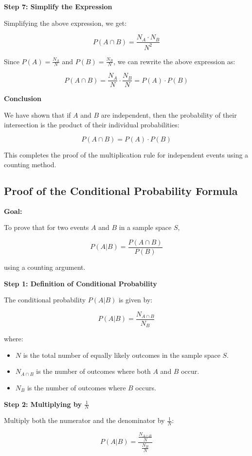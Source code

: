 \documentclass{article}
\begin{document}
\textbf{Step 7: Simplify the Expression}

Simplifying the above expression, we get:

\[
P(A \cap B) = \frac{N_A \cdot N_B}{N^2}
\]

Since \( P(A) = \frac{N_A}{N} \) and \( P(B) = \frac{N_B}{N} \), we can rewrite the above expression as:

\[
P(A \cap B) = \frac{N_A}{N} \cdot \frac{N_B}{N} = P(A) \cdot P(B)
\]

\textbf{Conclusion}

We have shown that if \( A \) and \( B \) are independent, then the probability of their intersection is the product of their individual probabilities:

\[
P(A \cap B) = P(A) \cdot P(B)
\]

This completes the proof of the multiplication rule for independent events using a counting method.

\subsection*{Proof of the Conditional Probability Formula}

\textbf{Goal:}

To prove that for two events \( A \) and \( B \) in a sample space \( S \),

\[ P(A|B) = \frac{P(A \cap B)}{P(B)} \]

using a counting argument.

\textbf{Step 1: Definition of Conditional Probability}

The conditional probability \( P(A|B) \) is given by:

\[
P(A|B) = \frac{N_{A \cap B}}{N_B}
\]

where:
\begin{itemize}
    \item \( N \) is the total number of equally likely outcomes in the sample space \( S \).
    \item \( N_{A \cap B} \) is the number of outcomes where both \( A \) and \( B \) occur.
    \item \( N_B \) is the number of outcomes where \( B \) occurs.
\end{itemize}

\textbf{Step 2: Multiplying by \( \frac{1}{N} \)}

Multiply both the numerator and the denominator by \( \frac{1}{N} \):

\[
P(A|B) = \frac{\frac{N_{A \cap B}}{N}}{\frac{N_B}{N}}
\]
\end{document}
